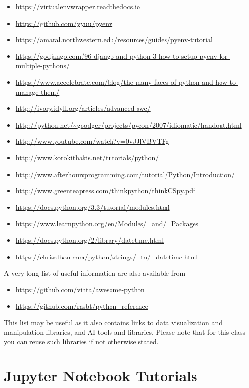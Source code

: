 \begin{itemize}
\item
  \url{https://virtualenvwrapper.readthedocs.io}
\item
  \url{https://github.com/yyuu/pyenv}
\item
  \url{https://amaral.northwestern.edu/resources/guides/pyenv-tutorial}
\item
  \url{https://godjango.com/96-django-and-python-3-how-to-setup-pyenv-for-multiple-pythons/}
\item
  \url{https://www.accelebrate.com/blog/the-many-faces-of-python-and-how-to-manage-them/}
\item
  \url{http://ivory.idyll.org/articles/advanced-swc/}
\item
  \url{http://python.net/~goodger/projects/pycon/2007/idiomatic/handout.html}
\item
  \url{http://www.youtube.com/watch?v=0vJJlVBVTFg}
\item
  \url{http://www.korokithakis.net/tutorials/python/}
\item
  \url{http://www.afterhoursprogramming.com/tutorial/Python/Introduction/}
\item
  \url{http://www.greenteapress.com/thinkpython/thinkCSpy.pdf}
\item
  \url{https://docs.python.org/3.3/tutorial/modules.html}
\item
  \url{https://www.learnpython.org/en/Modules/_and/_Packages}
\item
  \url{https://docs.python.org/2/library/datetime.html}
\item
  \url{https://chrisalbon.com/python/strings/_to/_datetime.html}
\end{itemize}

A very long list of useful information are also available from

\begin{itemize}
\item
  \url{https://github.com/vinta/awesome-python}
\item
  \url{https://github.com/rasbt/python_reference}
\end{itemize}

This list may be useful as it also contains links to data visualization
and manipulation libraries, and AI tools and libraries. Please note that
for this class you can reuse such libraries if not otherwise stated.

\section{Jupyter Notebook Tutorials}\label{jupyter-notebook-tutorials}


